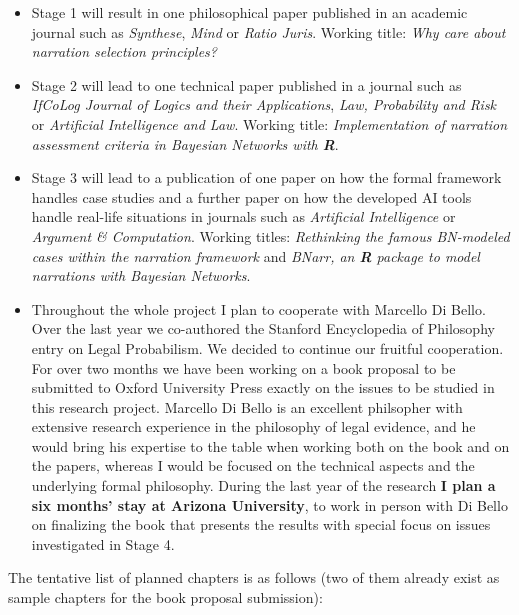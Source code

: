 \documentclass[11pt,dvipsnames,enabledeprecatedfontcommands]{scrartcl}
\begin{document}
\begin{itemize}\setlength\itemsep{1mm}
\item \textsf{Stage 1} will result in  one philosophical paper published in an  academic journal such as \emph{Synthese}, \emph{Mind} or \emph{Ratio Juris}. Working title: \emph{Why care about narration selection principles?}

\item \textsf{Stage 2} will lead to one   technical paper  published in a journal such as \emph{IfCoLog Journal of Logics and their Applications}, \emph{Law, Probability and Risk} or \emph{Artificial Intelligence and Law}. Working title: \emph{Implementation of narration assessment criteria in Bayesian Networks with \textbf{\textsf{R}}}.

\item \textsf{Stage 3}  will lead to a publication of one paper  on  how the formal framework handles case studies and  a further paper  on how the developed AI tools handle real-life situations in   journals such as \emph{Artificial Intelligence} or \emph{Argument \& Computation}. Working titles: \emph{Rethinking the famous BN-modeled cases within the narration framework} and \emph{BNarr, an \textbf{\textsf{R}} package to model narrations with Bayesian Networks}.

\item Throughout the  whole project I plan to cooperate with Marcello Di Bello. Over the last year we co-authored the Stanford Encyclopedia of Philosophy entry on Legal Probabilism. We decided to continue our fruitful cooperation. For over two months we have been working on a book proposal to be submitted to Oxford University Press exactly on the issues to be studied in this research project. Marcello Di Bello is an excellent philsopher with extensive research experience in the philosophy of legal evidence, and he would bring his expertise to the table when working both on the book and on the papers, whereas I would be focused on the technical aspects and the underlying  formal philosophy. During the last year of the research \textbf{I plan a six months' stay at Arizona University}, to work in person with Di Bello on finalizing the book that presents the results with special focus on issues investigated in \textsf{Stage 4}.
\end{itemize}

\pagebreak

The tentative list of planned chapters is as follows (two of them
already exist as sample chapters for the book proposal submission):
\end{document}
